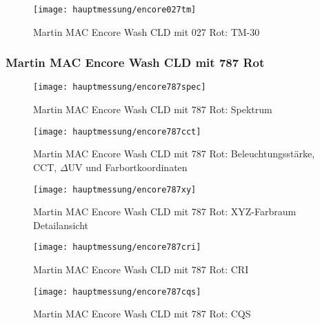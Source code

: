 \documentclass[pagesize,paper=A4,fontsize=12pt,utf8,numbers=noenddot,bibliography=totoc,listof=totoc,DIV=11,BCOR=1mm]{scrreprt}
\begin{document}
\begin{figure}[htp]     %
\centering
\texttt{[image: hauptmessung/encore027tm]} 
\caption {Martin MAC Encore Wash CLD mit 027 Rot: TM-30} 
\end{figure}

\subsubsection{Martin MAC Encore Wash CLD mit 787 Rot}

\begin{figure}[htp]     %
\centering
\texttt{[image: hauptmessung/encore787spec]} 
\caption {Martin MAC Encore Wash CLD mit 787 Rot: Spektrum} 
\end{figure}

\begin{figure}[htp]     %
\centering
\texttt{[image: hauptmessung/encore787cct]} 
\caption {Martin MAC Encore Wash CLD mit 787 Rot: Beleuchtungsstärke, CCT, $\Delta$UV und Farbortkoordinaten} 
\end{figure}

\begin{figure}[htp]     %
\centering
\texttt{[image: hauptmessung/encore787xy]} 
\caption {Martin MAC Encore Wash CLD mit 787 Rot: XYZ-Farbraum Detailansicht} 
\end{figure}

\begin{figure}[htp]     %
\centering
\texttt{[image: hauptmessung/encore787cri]} 
\caption {Martin MAC Encore Wash CLD mit 787 Rot: CRI} 
\end{figure}

\begin{figure}[htp]     %
\centering
\texttt{[image: hauptmessung/encore787cqs]} 
\caption {Martin MAC Encore Wash CLD mit 787 Rot: CQS} 
\end{figure}
\end{document}

